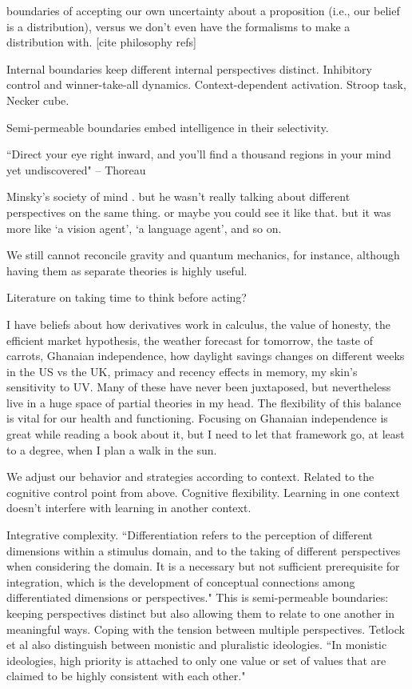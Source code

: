 boundaries of accepting our own uncertainty about a proposition (i.e., our belief is a distribution), versus we don't even have the formalisms to make a distribution with. [cite philosophy refs]


Internal boundaries keep different internal perspectives distinct. Inhibitory control and winner-take-all dynamics. Context-dependent activation. Stroop task, Necker cube.  \citep{miyake2000unity}

Semi-permeable boundaries embed intelligence in their selectivity. 

``Direct your eye right inward, and you'll find a thousand regions in your mind yet undiscovered" -- Thoreau

Minsky's society of mind  \citep{minsky1986society}. but he wasn't really talking about different perspectives on the same thing. or maybe you could see it like that. but it was more like `a vision agent', `a language agent', and so on.

We still cannot reconcile gravity and quantum mechanics, for instance, although having them as separate theories is highly useful.

Literature on taking time to think before acting?

I have beliefs about how derivatives work in calculus, the value of honesty, the efficient market hypothesis, the weather forecast for tomorrow, the taste of carrots, Ghanaian independence, how daylight savings changes on different weeks in the US vs the UK, primacy and recency effects in memory, my skin's sensitivity to UV. Many of these have never been juxtaposed, but nevertheless live in a huge space of partial theories in my head. The flexibility of this balance is vital for our health and functioning. Focusing on Ghanaian independence is great while reading a book about it, but I need to let that framework go, at least to a degree, when I plan a walk in the sun.

We adjust our behavior and strategies according to context. Related to the cognitive control point from above. Cognitive flexibility. Learning in one context doesn't interfere with learning in another context. 

Integrative complexity. ``Differentiation refers to the perception of different dimensions within a stimulus domain, and to the taking of different perspectives when considering the domain. It is a necessary but not sufficient prerequisite for integration, which is the development of conceptual connections among differentiated dimensions or perspectives." This is semi-permeable boundaries: keeping perspectives distinct but also allowing them to relate to one another in meaningful ways. Coping with the tension between multiple perspectives. Tetlock et al also distinguish between monistic and pluralistic ideologies. ``In monistic ideologies, high priority is attached to only one value or set of values that are claimed to be highly consistent with each other." 

